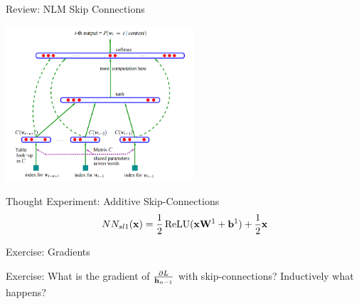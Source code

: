 \documentclass{beamer}
\begin{document}
\begin{frame}{Review: NLM Skip Connections}
  \begin{center}
    \includegraphics[width=7cm]{bengio}
  \end{center}
\end{frame}


\begin{frame}{Thought Experiment: Additive Skip-Connections}
  \[NN_{sl1}(\boldx) = \frac{1}{2} \relu(\boldx \boldW^1 + \boldb^1) + \frac{1}{2} \boldx \]
      \begin{center}
    \end{center}
  
\end{frame}

\begin{frame}{Exercise: Gradients}

  Exercise: What is the gradient of $\frac{\partial L}{\mathbf{h}_{n-1}}$ with skip-connections?
  Inductively what happens?

  \begin{center}
  \end{center}
\end{frame}
\end{document}
